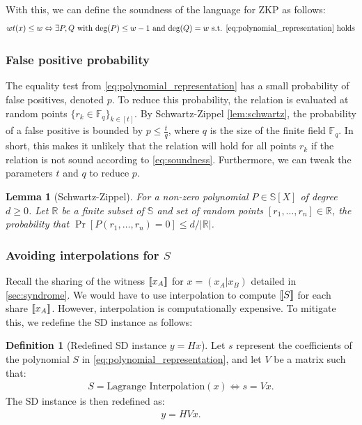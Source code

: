 \documentclass[11pt]{report}
\theoremstyle{definition}
\newtheorem{definition}{Definition}[section]
\theoremstyle{plain}
\newtheorem{lemma}{Lemma}[section]
\begin{document}
With this, we can define the soundness of the language for ZKP as follows:
\begin{equation}
  wt(x) \leq w \Leftrightarrow \exists P,Q \text{  with  }\text{deg}(P)\leq w-1\text{  and  }\text{deg}(Q) = w\text{ s.t. \autoref{eq:polynomial_representation} holds}\label{eq:soundness}
\end{equation}

\subsubsection{False positive probability}\label{sub:equality_test}
The equality test from \autoref{eq:polynomial_representation} has a small probability of false positives, denoted $p$. To reduce this probability, the relation is evaluated at random points $\{r_k \in \mathbb{F}_q\}_{k\in[t]}$. By Schwartz-Zippel \autoref{lem:schwartz}, the probability of a false positive is bounded by $p \leq \frac{t}{q}$, where $q$ is the size of the finite field $\mathbb{F}_q$. In short, this makes it unlikely that the relation will hold for all points $r_k$ if the relation is not sound according to \autoref{eq:soundness}. Furthermore, we can tweak the parameters $t$ and $q$ to reduce $p$.

\begin{lemma}[Schwartz-Zippel]\label{lem:schwartz}
  For a non-zero polynomial $P \in \mathbb{S}[X]$ of degree $d \geq 0$. Let $\mathbb{R}$ be a finite subset of $\mathbb{S}$ and set of random points $[r_1, \dots, r_n] \in \mathbb{R}$, the probability that $\Pr[P(r_1, \dots, r_n) = 0] \leq d/|\mathbb{R}|$.
\end{lemma}

\subsubsection{Avoiding interpolations for $S$}\label{sec:syndrome-avoid-interpolation}
Recall the sharing of the witness $\llbracket x_A \rrbracket$ for $x = (x_A | x_B)$ detailed in \autoref{sec:syndrome}. We would have to use interpolation to compute $\llbracket S \rrbracket$ for each share $\llbracket x_A \rrbracket$. However, interpolation is computationally expensive. To mitigate this, we redefine the SD instance as follows:

\begin{definition}[Redefined SD instance $y = Hx$]
  Let $s$ represent the coefficients of the polynomial $S$ in \autoref{eq:polynomial_representation}, and let $V$ be a matrix such that:
  \begin{align*}
    S = \text{Lagrange Interpolation}(x) \Leftrightarrow s = Vx.
  \end{align*}
  The SD instance is then redefined as:
  \begin{align*}
    y = HVx.
  \end{align*}
\end{definition}
\end{document}
